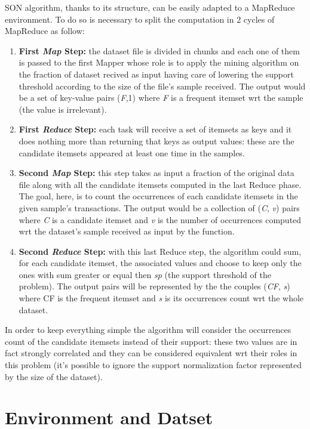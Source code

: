 \documentclass[]{report}
\begin{document}
	SON algorithm, thanks to its structure, can be easily adapted to a MapReduce environment. To do so is necessary to split the computation in 2 cycles of MapReduce as follow:
	\begin{enumerate}
		\item \textbf{First \textit{Map} Step:} the dataset file is divided in chunks and each one of them is passed to the first Mapper whose role is to apply the mining algorithm on the fraction of dataset recived as input having care of lowering the support threshold according to the size of the file's sample received. The output would be a set of key-value pairs (\textit{F},1) where \textit{F} is a frequent itemset wrt the sample (the value is irrelevant).
		\item \textbf{First \textit{Reduce} Step:} each task will receive a set of itemsets as keys and it does nothing more than returning that keys as output values: these are the candidate itemsets appeared at least one time in the samples.   
		\item \textbf{Second \textit{Map} Step:} this step takes as input a fraction of the original data file along with all the candidate itemsets computed in the last Reduce phase. The goal, here, is to count the occurrences of each candidate itemsets in the given sample's transactions. The output would be a collection of (\textit{C}, \textit{v}) pairs where \textit{C} is a candidate itemset and \textit{v} is the number of occurrences computed wrt the dataset's sample received as input by the function.
		\item \textbf{Second \textit{Reduce} Step:} 
		with this last Reduce step, the algorithm could sum, for each candidate itemset, the associated values and choose to keep only the ones with sum greater or equal then \textit{sp} (the support threshold of the problem). The output pairs will be represented by the the couples (\textit{CF}, \textit{s}) where CF is the frequent itemset and \textit{s} is its occurrences count wrt the whole dataset. 
	\end{enumerate}	
	In order to keep everything simple the algorithm will consider the occurrences count of the candidate itemsets instead of their support: these two values are in fact strongly correlated and they can be considered equivalent wrt their roles in this problem (it's possible to ignore the support normalization factor represented by the size of the dataset).	 	
	
\chapter*{\huge Environment and Datset}
\end{document}

